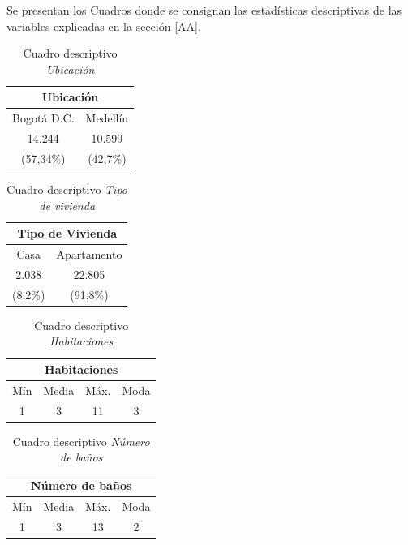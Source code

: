 \documentclass[conference, 10pt]{IEEEtran}
\begin{document}
Se presentan los Cuadros donde se consignan las estadísticas descriptivas de las variables explicadas en la sección \ref{AA}.\\ 
\begin{table}[htbp]
\caption{Cuadro descriptivo \textit{Ubicación}}
\begin{center}
\begin{tabular}{|c|c|}
\hline
\multicolumn{2}{|c|}{\textbf{Ubicación}} \\
\cline{1-2} 
\hline
 Bogotá D.C.&Medellín\\
 14.244&10.599\\
 (57,34\%)&(42,7\%)\\
 
	\hline
\end{tabular}
\label{tab_1}
\end{center}
\end{table}

\begin{table}[htbp]
\caption{Cuadro descriptivo \textit{Tipo de vivienda}}
\begin{center}
\begin{tabular}{|c|c|}
\hline
\multicolumn{2}{|c|}{\textbf{Tipo de Vivienda}} \\
\cline{1-2} 
\hline
 Casa&Apartamento\\
 2.038&22.805\\
 (8,2\%)&(91,8\%)\\
 
	\hline
\end{tabular}
\label{tab_2}
\end{center}
\end{table}

\begin{table}[htbp]
\caption{Cuadro descriptivo \textit{Habitaciones}}
\begin{center}
\begin{tabular}{|c|c|c|c|}
\hline
\multicolumn{4}{|c|}{\textbf{Habitaciones}} \\
\cline{1-4} 
\hline
 Mín&Media&Máx.&Moda\\
\hline
 1&3&11&3\\
 	\hline
\end{tabular}
\label{tab_3}
\end{center}
\end{table}

\begin{table}[htbp]
\caption{Cuadro descriptivo \textit{Número de baños}}
\begin{center}
\begin{tabular}{|c|c|c|c|}
\hline
\multicolumn{4}{|c|}{\textbf{Número de baños}} \\
\cline{1-4} 
\hline
 Mín&Media&Máx.&Moda\\
\hline
 1&3&13&2\\
 	\hline
\end{tabular}
\label{tab_4}
\end{center}
\end{table}
\end{document}
